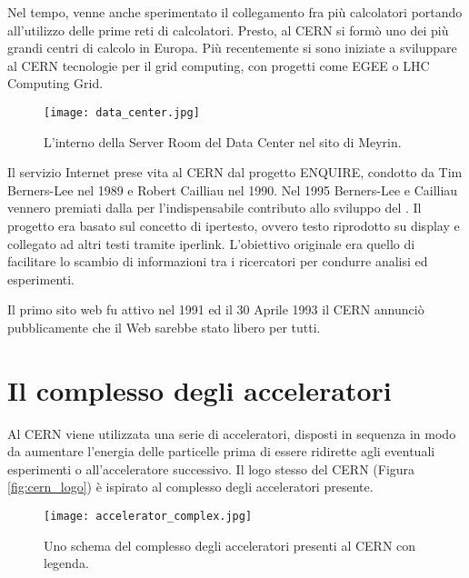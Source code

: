 			Nel tempo, venne anche sperimentato il collegamento fra più calcolatori portando all'utilizzo delle prime reti di calcolatori. Presto, al \ac{CERN} si formò uno dei più grandi centri di calcolo in Europa. Più recentemente si sono iniziate a sviluppare al \ac{CERN} tecnologie per il grid computing, con progetti come \ac{EGEE} o LHC Computing Grid.
			
			\begin{figure}[h!]
				\begin{center}
					\texttt{[image: data\_center.jpg]}
				\end{center}
				\caption[Server Room del Data Center]{L'interno della Server Room del Data Center nel sito di Meyrin.}
				\label{fig:data_center}
			\end{figure}
			
			Il servizio Internet  prese vita al \ac{CERN} dal progetto ENQUIRE, condotto da Tim Berners-Lee nel 1989 e Robert Cailliau nel 1990. Nel 1995 Berners-Lee e Cailliau vennero premiati dalla  per l'indispensabile contributo allo sviluppo del . Il progetto era basato sul concetto di ipertesto, ovvero testo riprodotto su display e collegato ad altri testi tramite iperlink. L'obiettivo originale era quello di facilitare lo scambio di informazioni tra i ricercatori per condurre analisi ed esperimenti.
			
			Il primo sito web fu attivo nel 1991 ed il 30 Aprile 1993 il \ac{CERN} annunciò pubblicamente che il Web sarebbe stato libero per tutti.
			
	\section{Il complesso degli acceleratori} \label{sec:C;acceleratori}
	
		Al \ac{CERN} viene utilizzata una serie di acceleratori, disposti in sequenza in modo da aumentare l'energia delle particelle prima di essere ridirette agli eventuali esperimenti o all'acceleratore successivo. Il logo stesso del \ac{CERN} (Figura \ref{fig:cern_logo}) è ispirato al complesso degli acceleratori presente.
			
		\begin{figure}[h!]
			\begin{center}
				\texttt{[image: accelerator\_complex.jpg]}
			\end{center}
			\caption[Complesso degli acceleratori]{Uno schema del complesso degli acceleratori presenti al CERN con legenda.}
			\label{fig:accelerator_complex}
		\end{figure}
		
